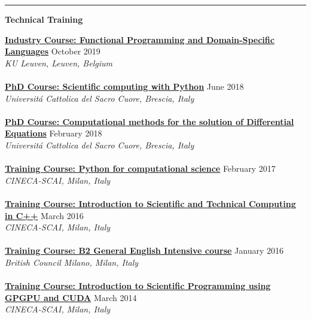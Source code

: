 \documentclass[a4paper]{article}
\newcommand{\block}[1]{\hrule \vspace{0.2cm} \textbf{\Large #1} \vspace{0.2cm}}
\newcommand{\longvoice}[8]{
    \voice{#2: #1}
        {#4}
        {#5, #6, #7}
        {#3}
        {#8 \vspace{-\baselineskip}}
    }
\newcommand{\voice}[5]{\href{#4}{\textbf{#1}} \hfill #2 \\ \textit{#3} \\ {\small #5} \vspace{0.2cm} \\}
\begin{document}
    \block{Technical Training}
   
    \longvoice{Functional Programming and Domain-Specific Languages}
        {Industry Course}
        {https://dtai.cs.kuleuven.be/events/fpcourse/}
        {October 2019}
        {KU Leuven}
        {Leuven}
        {Belgium}
        {}
    \longvoice{Scientific computing with Python}
        {PhD Course}
        {https://web.archive.org/web/20180604081514/http://dmf.unicatt.it/~della/pythoncourse18/}
        {June 2018}
        {Universit\'a Cattolica del Sacro Cuore}
        {Brescia}
        {Italy}
        {}
    \longvoice{Computational methods for the solution of Differential Equations}
        {PhD Course}
        {https://www.dropbox.com/s/q2rapau2k49n5t7/1802-Course-NumericalPdeAvella.pdf?dl=0}
        {February 2018}
        {Universit\'a Cattolica del Sacro Cuore}
        {Brescia}
        {Italy}
        {}
    \longvoice{Python for computational science}
        {Training Course}
        {https://web.archive.org/web/20170623170252/https://eventi.cineca.it/en/hpc/python-computational-science}
        {February 2017}
        {CINECA-SCAI}
        {Milan}
        {Italy}
        {}
    \longvoice{Introduction to Scientific and Technical Computing in C++}
        {Training Course}
        {https://web.archive.org/save/http://www.hpc.cineca.it/content/introduction-object-oriented}
        {March 2016}
        {CINECA-SCAI}
        {Milan}
        {Italy}
        {}
    \longvoice{B2 General English Intensive course}
        {Training Course}
        {https://www.britishcouncil.it/en/english/courses-adults/general}
        {January 2016}
        {British Council Milano}
        {Milan}
        {Italy}
        {}
    \longvoice{Introduction to Scientific Programming using GPGPU and CUDA}
        {Training Course}
        {https://web.archive.org/web/20170623171128/http://www.hpc.cineca.it/content/introduction-to-gpu}
        {March 2014}
        {CINECA-SCAI}
        {Milan}
        {Italy}
        {}
    
\end{document}
